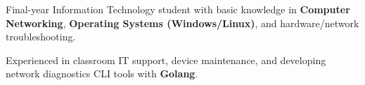 \begin{cvempty} %
	\begin{cvitems} %
		\item{Final-year Information Technology student with basic knowledge in \textbf{Computer Networking}, \textbf{Operating Systems (Windows/Linux)}, and hardware/network troubleshooting.}
		\item{Experienced in classroom IT support, device maintenance, and developing network diagnostics CLI tools with \textbf{Golang}.}
	\end{cvitems}
\end{cvempty}
